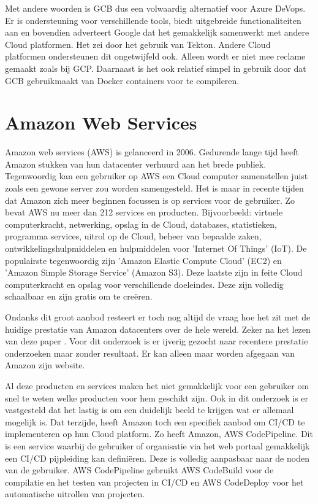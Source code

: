 Met andere woorden is GCB dus een volwaardig alternatief voor Azure DeVops. Er is ondersteuning voor verschillende tools, biedt uitgebreide functionaliteiten aan en bovendien adverteert Google dat het gemakkelijk samenwerkt met andere Cloud platformen. Het zei door het gebruik van Tekton. Andere Cloud platformen ondersteunen dit ongetwijfeld ook. Alleen wordt er niet mee reclame gemaakt zoals bij GCP. Daarnaast is het ook relatief simpel in gebruik door dat GCB gebruikmaakt van Docker containers voor te compileren.

\section{Amazon Web Services}
\label{sec:amazonaws}
Amazon web services (AWS) is gelanceerd in 2006. Gedurende lange tijd heeft Amazon stukken van hun datacenter verhuurd aan het brede publiek. Tegenwoordig kan een gebruiker op AWS een Cloud computer samenstellen juist zoals een gewone server zou worden samengesteld. Het is maar in recente tijden dat Amazon zich meer beginnen focussen is op services voor de gebruiker. Zo bevat AWS nu meer dan 212 services en producten. Bijvoorbeeld: virtuele computerkracht, netwerking, opslag in de Cloud, databases, statistieken, programma services, uitrol op de Cloud, beheer van bepaalde zaken, ontwikkelingshulpmiddelen en hulpmiddelen voor 'Internet Of Things' (IoT). De populairste tegenwoordig zijn 'Amazon Elastic Compute Cloud' (EC2) en 'Amazon Simple Storage Service' (Amazon S3). Deze laatste zijn in feite Cloud computerkracht en opslag voor verschillende doeleindes. Deze zijn volledig schaalbaar en zijn gratis om te creëren.

Ondanks dit groot aanbod resteert er toch nog altijd de vraag hoe het zit met de huidige prestatie van Amazon datacenters over de hele wereld. Zeker na het lezen van deze paper \autocite{Jackson2010}. Voor dit onderzoek is er ijverig gezocht naar recentere prestatie onderzoeken maar zonder resultaat. Er kan alleen maar worden afgegaan van Amazon zijn website.

Al deze producten en services maken het niet gemakkelijk voor een gebruiker om snel te weten welke producten voor hem geschikt zijn. Ook in dit onderzoek is er vastgesteld dat het lastig is om een duidelijk beeld te krijgen wat er allemaal mogelijk is. Dat terzijde, heeft Amazon toch een specifiek aanbod om CI/CD te implementeren op hun Cloud platform. Zo heeft Amazon, AWS CodePipeline. Dit is een service waarbij de gebruiker of organisatie via het web portaal gemakkelijk een CI/CD pijpleiding kan definiëren. Deze is volledig aanpasbaar naar de noden van de gebruiker. AWS CodePipeline gebruikt AWS CodeBuild voor de compilatie en het testen van projecten in CI/CD en AWS CodeDeploy voor het automatische uitrollen van projecten.

